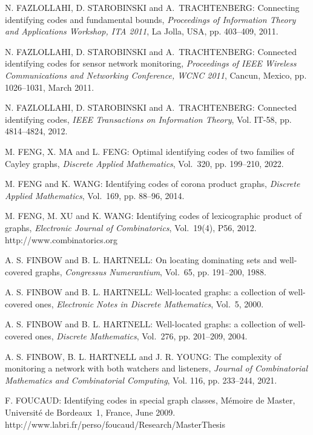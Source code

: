 \begin{thebibliography}{999}
N. FAZLOLLAHI, D. STAROBINSKI and A.~TRACHTENBERG: Connecting identifying codes and fundamental bounds, {\it Proceedings of Information Theory and Applications Workshop, ITA 2011}, La Jolla, USA, pp. 403--409, 2011.

N. FAZLOLLAHI, D. STAROBINSKI and A.~TRACHTENBERG: Connected identifying codes for sensor network monitoring, {\it Proceedings of IEEE Wireless Communications and Networking Conference, WCNC 2011}, Cancun, Mexico, pp. 1026--1031, March 2011.

N. FAZLOLLAHI, D. STAROBINSKI and A.~TRACHTENBERG: Connected identifying codes, {\it IEEE Transactions on Information Theory}, Vol. IT-58, pp. 4814--4824, 2012.

M. FENG, X. MA and L. FENG: Optimal identifying codes of two families of Cayley graphs, {\it Discrete Applied Mathematics}, Vol.~320, pp. 199--210, 2022.

M. FENG and K. WANG: Identifying codes of corona product graphs, {\it Discrete Applied Mathematics}, Vol.~169, pp. 88--96, 2014.

M. FENG, M. XU and K. WANG: Identifying codes of lexicographic product of graphs, {\it Electronic Journal of Combinatorics}, Vol.~19(4), P56, 2012.\\
http://www.combinatorics.org

A. S. FINBOW and B. L. HARTNELL: On locating dominating sets and well-covered graphs, {\it Congressus Numerantium}, Vol.~65, pp. 191--200, 1988.

A. S. FINBOW and B. L. HARTNELL: Well-located graphs: a collection of well-covered ones, {\it Electronic Notes in Discrete Mathematics}, Vol.~5, 2000.

A. S. FINBOW and B. L. HARTNELL: Well-located graphs: a collection of well-covered ones, {\it Discrete Mathematics}, Vol.~276, pp. 201--209, 2004.

A. S. FINBOW, B. L. HARTNELL and J. R. YOUNG: The complexity of monitoring a network with both watchers and listeners, {\it Journal of Combinatorial Mathematics and Combinatorial Computing}, Vol. 116, pp. 233--244, 2021.

F. FOUCAUD: Identifying codes in special graph classes, M\'emoire de Master, Universit\'e de Bordeaux~1, France, June 2009.\\http://www.labri.fr/perso/foucaud/Research/MasterThesis


\end{thebibliography}
